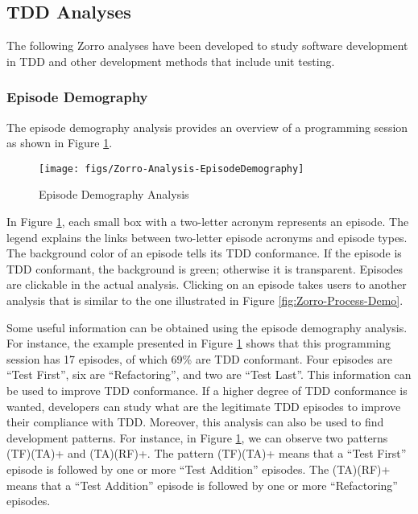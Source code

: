 \subsection{TDD Analyses}
\label{sec:Zorro-Analysis}
The following Zorro analyses have been developed to study software 
development in TDD and other development methods that include
unit testing.

\subsubsection{Episode Demography}
The episode demography analysis provides an overview of a programming 
session as shown in Figure \ref{fig:Zorro-Analysis-EpisodeDemography}. 
\begin{figure}[htbp]
  \centering
  \texttt{[image: figs/Zorro-Analysis-EpisodeDemography]}
  \caption{Episode Demography Analysis}
  \label{fig:Zorro-Analysis-EpisodeDemography}
\end{figure}
In Figure \ref{fig:Zorro-Analysis-EpisodeDemography}, each small 
box with a two-letter acronym represents an episode. The legend
explains the links between two-letter episode acronyms and episode types. 
The background color of an episode tells its TDD conformance. 
If the episode is TDD conformant, the background is green; otherwise 
it is transparent. Episodes are clickable in the actual analysis. 
Clicking on an episode takes users to another analysis that is 
similar to the one illustrated in Figure \ref{fig:Zorro-Process-Demo}. 

Some useful information can be obtained using the episode demography
analysis. For instance, the example presented in Figure 
\ref{fig:Zorro-Analysis-EpisodeDemography} shows that this programming
session has 17 episodes, of which 69\% are TDD conformant. Four
episodes are ``Test First'', six are ``Refactoring'', and 
two are ``Test Last''. This information can be used to 
improve TDD conformance. If a higher degree of TDD conformance
is wanted, developers can study what are the legitimate TDD episodes 
to improve their compliance with TDD. Moreover, this analysis
can also be used to find development patterns. For instance, in
Figure \ref{fig:Zorro-Analysis-EpisodeDemography}, we can observe 
two patterns (TF)(TA)+ and (TA)(RF)+. The pattern (TF)(TA)+ means that 
a ``Test First'' episode is followed by one or more ``Test Addition''
episodes. The (TA)(RF)+ means that a ``Test Addition'' episode is 
followed by one or more ``Refactoring'' episodes.

